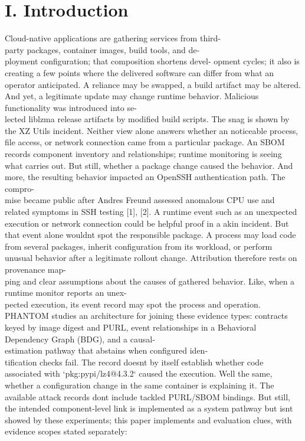 \documentclass[conference]{IEEEtran}
\begin{document}
\section*{I. Introduction}
Cloud-native applications are gathering services from third-\\party packages, container images, build tools, and de-\\ployment configuration; that composition shortens devel- opment cycles; it also is creating a few points where the delivered software can differ from what an operator anticipated. A reliance may be swapped, a build artifact may be altered. And yet, a legitimate update may change runtime behavior. Malicious functionality was introduced into se-\\lected liblzma release artifacts by modified build scripts. The snag is shown by the XZ Utils incident. Neither view alone answers whether an noticeable process, file access, or network connection came from a particular package. An SBOM records component inventory and relationships; runtime monitoring is seeing what carries out. But still, whether a package change caused the behavior. And more, the resulting behavior impacted an OpenSSH authentication path. The compro-\\mise became public after Andres Freund assessed anomalous CPU use and related symptoms in SSH testing {[}1{]}, {[}2{]}. A runtime event such as an unexpected execution or network connection could be helpful proof in a akin incident. But that event alone wouldn\textquotesingle t spot the responsible package. A process may load code from several packages, inherit configuration from its workload, or perform unusual behavior after a legitimate rollout change. Attribution therefore rests on provenance map-\\ping and clear assumptions about the causes of gathered behavior. Like, when a runtime monitor reports an unex-\\pected execution, its event record may spot the process and operation. PHANTOM studies an architecture for joining these evidence types: contracts keyed by image digest and PURL, event relationships in a Behavioral Dependency Graph (BDG), and a causal-\\estimation pathway that abstains when configured iden-\\tification checks fail. The record doesn\textquotesingle t by itself establish whether code associated with `pkg:pypi/lz4@4.3.2` caused the execution. Well the same, whether a configuration change in the same container is explaining it. The available attack records don\textquotesingle t include tackled PURL/SBOM bindings. But still, the intended component-level link is implemented as a system pathway but isn\textquotesingle t showed by these experiments; this paper implements and evaluation clues, with evidence scopes stated separately:
\end{document}
